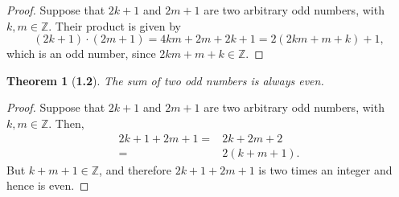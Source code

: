 \documentclass[11pt]{article}
\newtheorem*{theorem}{Theorem}
\begin{document}
\begin{proof}
Suppose that $2k+1$ and $2m+1$ are two arbitrary odd numbers, with $k,m\in \mathbb Z$.  Their product is given by 
\[
(2k+1)\cdot (2m+1)=4km+2m+2k+1=2(2km+m+k)+1,
\] 
which is an odd number, since $2km+m+k\in \mathbb Z$. 
\end{proof}

\begin{theorem}[\textbf{1.2}]
The sum of two odd numbers is always even. 
\end{theorem}

\begin{proof}
Suppose that $2k+1$ and $2m+1$ are two arbitrary odd numbers, with $k,m\in \mathbb Z$.  Then,
\begin{eqnarray*}
2k+1+2m+1=& 2k+2m+2\\
=&2(k+m+1).
\end{eqnarray*}
But $k+m+1\in\mathbb Z$, and therefore $2k+1+2m+1$ is two times an integer and hence is even. 
\end{proof}
\end{document}

